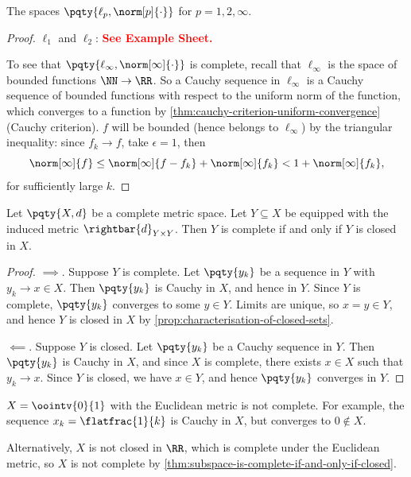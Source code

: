 \begin{theorem}
    \label{thm:completeness-of-ellp}%
    The spaces \(\pqty{\ell_p, \norm[p]{\cdot}}\) for \(p = 1, 2, \infty\).
\end{theorem}

\begin{proof}
    \(\ell_1\) and \(\ell_2\): \textbf{\textcolor{red}{See Example Sheet.}}

    To see that \(\pqty{\ell_{\infty}, \norm[\infty]{\cdot}}\) is complete, recall that \(\ell_{\infty}\) is the space of bounded functions \(\NN \to \RR\). So a Cauchy sequence in \(\ell_{\infty}\) is a Cauchy sequence of bounded functions with respect to the uniform norm of the function, which converges to a function by \autoref{thm:cauchy-criterion-uniform-convergence} (Cauchy criterion). \(f\) will be bounded (hence belongs to \(\ell_{\infty}\)) by the triangular inequality: since \(f_k \to f\), take \(\epsilon = 1\), then
    \[
        \norm[\infty]{f} \leq \norm[\infty]{f - f_k} + \norm[\infty]{f_k} < 1 + \norm[\infty]{f_k},
    \]
    for sufficiently large \(k\).
\end{proof}

\begin{theorem}
    \label{thm:subspace-is-complete-if-and-only-if-closed}%
    Let \(\pqty{X, d}\) be a complete metric space. Let \(Y \subseteq X\) be equipped with the induced metric \(\rightbar{d}_{Y \times Y}\). Then \(Y\) is complete if and only if \(Y\) is closed in \(X\).
\end{theorem}

\begin{proof}
    \(\implies\). Suppose \(Y\) is complete. Let \(\pqty{y_k}\) be a sequence in \(Y\) with \(y_k \to x \in X\). Then \(\pqty{y_k}\) is Cauchy in \(X\), and hence in \(Y\). Since \(Y\) is complete, \(\pqty{y_k}\) converges to some \(y \in Y\). Limits are unique, so \(x = y \in Y\), and hence \(Y\) is closed in \(X\) by \autoref{prop:characterisation-of-closed-sets}.

    \(\impliedby\). Suppose \(Y\) is closed. Let \(\pqty{y_k}\) be a Cauchy sequence in \(Y\). Then \(\pqty{y_k}\) is Cauchy in \(X\), and since \(X\) is complete, there exists \(x \in X\) such that \(y_k \to x\). Since \(Y\) is closed, we have \(x \in Y\), and hence \(\pqty{y_k}\) converges in \(Y\).
\end{proof}

\begin{example}
    \(X = \oointv{0}{1}\) with the Euclidean metric is not complete. For example, the sequence \(x_k = \flatfrac{1}{k}\) is Cauchy in \(X\), but converges to \(0 \notin X\).

    Alternatively, \(X\) is not closed in \(\RR\), which is complete under the Euclidean metric, so \(X\) is not complete by \autoref{thm:subspace-is-complete-if-and-only-if-closed}.
\end{example}

